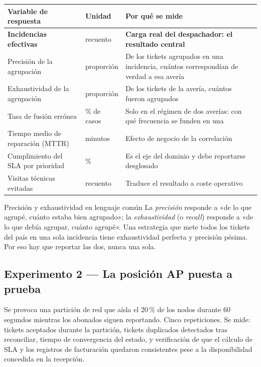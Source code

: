 \documentclass[11pt,a4paper]{article}
\begin{document}
\begin{center}
	\small
	\begin{tabular}{@{}p{5.4cm}p{3.2cm}p{6.4cm}@{}}
		\toprule
		\textbf{Variable de respuesta} & \textbf{Unidad} & \textbf{Por qué se mide} \\
		\midrule
		\textbf{Incidencias efectivas} & recuento & \textbf{Carga real del despachador: el resultado central} \\
		Precisión de la agrupación & proporción & De los tickets agrupados en una incidencia, cuántos correspondían de verdad a esa avería \\
		Exhaustividad de la agrupación & proporción & De los tickets de la avería, cuántos fueron agrupados \\
		Tasa de fusión errónea & \% de casos & Solo en el régimen de dos averías: con qué frecuencia se funden en una \\
		Tiempo medio de reparación (MTTR) & minutos & Efecto de negocio de la correlación \\
		Cumplimiento del SLA por prioridad & \% & Es el eje del dominio y debe reportarse desglosado \\
		Visitas técnicas evitadas & recuento & Traduce el resultado a coste operativo \\
		\bottomrule
	\end{tabular}
\end{center}

\begin{aviso}{Precisión y exhaustividad en lenguaje común}
	La \emph{precisión} responde a «de lo que agrupé, cuánto estaba bien agrupado»; la \emph{exhaustividad} (o \emph{recall}) responde a «de lo que debía agrupar, cuánto agrupé». Una estrategia que mete todos los tickets del país en una sola incidencia tiene exhaustividad perfecta y precisión pésima. Por eso hay que reportar las dos, nunca una sola.
\end{aviso}

\subsection{Experimento 2 --- La posición AP puesta a prueba}

Se provoca una partición de red que aísla el 20\,\% de los nodos durante 60 segundos mientras los abonados siguen reportando. Cinco repeticiones. Se mide: tickets aceptados durante la partición, tickets duplicados detectados tras reconciliar, tiempo de convergencia del estado, y verificación de que el cálculo de SLA y los registros de facturación quedaron consistentes pese a la disponibilidad concedida en la recepción.
\end{document}
